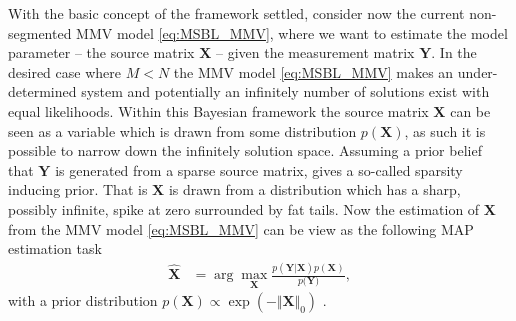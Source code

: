 With the basic concept of the framework settled, consider now the current non-segmented MMV model \eqref{eq:MSBL_MMV}, where we want to estimate the model parameter -- the source matrix $\textbf{X}$ -- given the measurement matrix $\textbf{Y}$.   
In the desired case where $M < N$ the MMV model \eqref{eq:MSBL_MMV} makes an under-determined system and potentially an infinitely number of solutions exist with equal likelihoods.  
Within this Bayesian framework the source matrix $\mathbf{X}$ can be seen as a variable which is drawn from some distribution $p(\mathbf{X})$, as such it is possible to narrow down the infinitely solution space. 
Assuming a prior belief that $\mathbf{Y}$ is generated from a sparse source matrix, gives a so-called sparsity inducing prior. 
That is $\mathbf{X}$ is drawn from a distribution which has a sharp, possibly infinite, spike at zero surrounded by fat tails.
Now the estimation of $\mathbf{X}$ from the MMV model \eqref{eq:MSBL_MMV} can be view as the following MAP estimation task 
\begin{align*}
\hat{\mathbf{X}} &= \arg \max_{\mathbf{X}} \frac{p(\mathbf{Y} \vert \mathbf{X}) p(\mathbf{X})}{p(\mathbf{Y)}},
\end{align*}
with a prior distribution $p(\mathbf{X}) \propto \exp \left( - \Vert \mathbf{X} \Vert_0\right)$ \cite[p. 14]{phd_wipf}.

